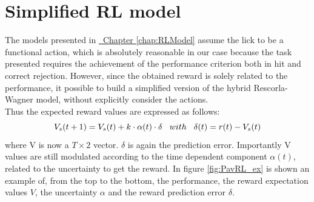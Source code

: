 \chapter{Simplified RL model}
The models presented in \hyperref[chap:RLModel]{~Chapter \ref*{chap:RLModel}} assume the lick to be a functional action, which is absolutely reasonable in our case because the task presented requires the achievement of the performance criterion both in hit and correct rejection. However, since the obtained reward is solely related to the performance, it possible to build a simplified version of the hybrid Rescorla-Wagner model, without explicitly consider the actions.\\Thus the expected reward values are expressed as follows:
\begin{equation}
V_s(t+1)=V_s(t)+k\cdot\alpha(t)\cdot\delta  \hspace{0.3cm} with \hspace{0.3cm}\delta(t)=r(t)-V_s(t)
\label{VValues}
\end{equation}
where V is now a $
T\times 2$ vector. $\delta$ is again the prediction error. Importantly V values are still modulated according to the time dependent component $\alpha(t)$, related to the uncertainty to get the reward. %
In figure \ref{fig:PavRL_ex} is shown an example of, from the top to the bottom, the performance, the reward expectation values $V$, the uncertainty $\alpha$ and the reward prediction error $\delta$.
